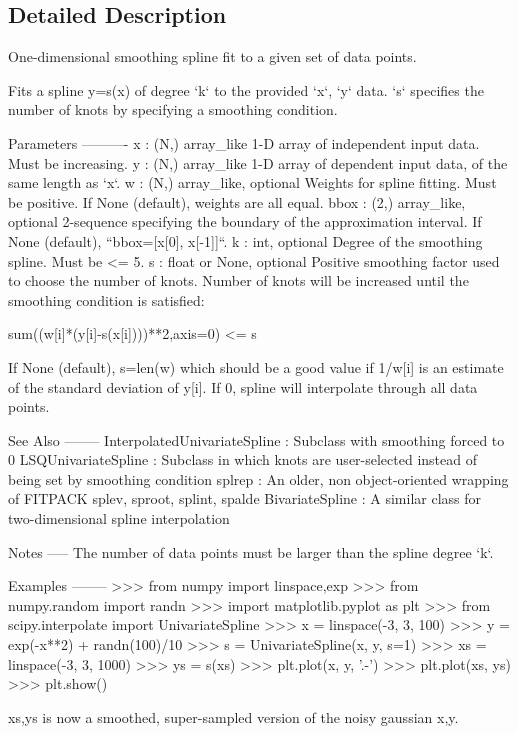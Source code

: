 \subsection{Detailed Description}
\begin{DoxyVerb}One-dimensional smoothing spline fit to a given set of data points.

Fits a spline y=s(x) of degree `k` to the provided `x`, `y` data.  `s`
specifies the number of knots by specifying a smoothing condition.

Parameters
----------
x : (N,) array_like
    1-D array of independent input data. Must be increasing.
y : (N,) array_like
    1-D array of dependent input data, of the same length as `x`.
w : (N,) array_like, optional
    Weights for spline fitting.  Must be positive.  If None (default),
    weights are all equal.
bbox : (2,) array_like, optional
    2-sequence specifying the boundary of the approximation interval. If
    None (default), ``bbox=[x[0], x[-1]]``.
k : int, optional
    Degree of the smoothing spline.  Must be <= 5.
s : float or None, optional
    Positive smoothing factor used to choose the number of knots.  Number
    of knots will be increased until the smoothing condition is satisfied:

    sum((w[i]*(y[i]-s(x[i])))**2,axis=0) <= s

    If None (default), s=len(w) which should be a good value if 1/w[i] is
    an estimate of the standard deviation of y[i].  If 0, spline will
    interpolate through all data points.

See Also
--------
InterpolatedUnivariateSpline : Subclass with smoothing forced to 0
LSQUnivariateSpline : Subclass in which knots are user-selected instead of
    being set by smoothing condition
splrep : An older, non object-oriented wrapping of FITPACK
splev, sproot, splint, spalde
BivariateSpline : A similar class for two-dimensional spline interpolation

Notes
-----
The number of data points must be larger than the spline degree `k`.

Examples
--------
>>> from numpy import linspace,exp
>>> from numpy.random import randn
>>> import matplotlib.pyplot as plt
>>> from scipy.interpolate import UnivariateSpline
>>> x = linspace(-3, 3, 100)
>>> y = exp(-x**2) + randn(100)/10
>>> s = UnivariateSpline(x, y, s=1)
>>> xs = linspace(-3, 3, 1000)
>>> ys = s(xs)
>>> plt.plot(x, y, '.-')
>>> plt.plot(xs, ys)
>>> plt.show()

xs,ys is now a smoothed, super-sampled version of the noisy gaussian x,y.\end{DoxyVerb}
 

